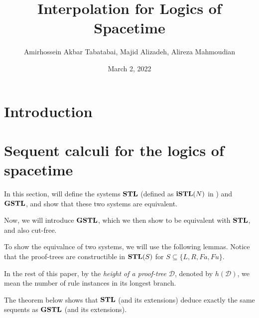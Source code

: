 \documentclass[12pt,a4paper]{article}
\begin{document}
    
\title{Interpolation for Logics of Spacetime}
\author[]{Amirhossein Akbar Tabatabai, Majid Alizadeh, Alireza Mahmoudian}
\affil[]{ }
\date{March 2, 2022}
\maketitle

\begin{abstract}
	
\end{abstract}

\section{Introduction}


\section{Sequent calculi for the logics of spacetime}
In this section, will define the systems $\mathbf{STL}$ (defined as $\mathbf{iSTL}(N)$ in \cite{amir}) and $\mathbf{GSTL}$, and show that these two systems are equivalent.



Now, we will introduce $\mathbf{GSTL}$, which we then show to be equivalent with $\mathbf{STL}$, and also cut-free.



To show the equivalnce of two systems, we will use the following lemmas. Notice that the proof-trees are constructible in $\mathbf{STL}(S)$ for $S \subseteq \{ L, R, Fa, Fu \}$.


















In the rest of this paper, by the \emph{height of a proof-tree} $\mathcal{D}$, denoted by $h(\mathcal{D})$, we mean the number of rule instances in its longest branch.

The theorem below shows that $\mathbf{STL}$ (and its extensions) deduce exactly the same sequents as $\mathbf{GSTL}$ (and its extensions).


\end{document}
